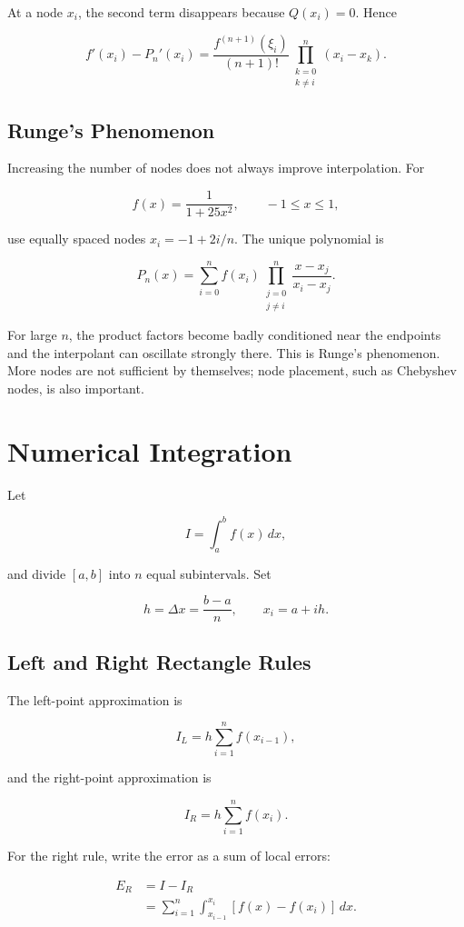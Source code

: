 \documentclass[12pt, a4paper]{article}
\theoremstyle{break}
\begin{document}
At a node \(x_i\), the second term disappears because \(Q(x_i)=0\). Hence

\[
f'(x_i)-P_n'(x_i)=
\frac{f^{(n+1)}(\xi_i)}{(n+1)!}
\prod_{\substack{k=0\\k\ne i}}^n(x_i-x_k).
\]

\subsection{Runge's Phenomenon}\label{runges-phenomenon}

Increasing the number of nodes does not always improve interpolation. For

\[
f(x)=\frac{1}{1+25x^2}, \qquad -1\le x\le 1,
\]

use equally spaced nodes \(x_i=-1+2i/n\). The unique polynomial is

\[
P_n(x)=\sum_{i=0}^n f(x_i)
\prod_{\substack{j=0\\j\ne i}}^n\frac{x-x_j}{x_i-x_j}.
\]

For large \(n\), the product factors become badly conditioned near the endpoints and the interpolant can oscillate strongly there. This is Runge's phenomenon. More nodes are not sufficient by themselves; node placement, such as Chebyshev nodes, is also important.

\section{Numerical Integration}\label{numerical-integration}

Let

\[
I=\int_a^b f(x)\,dx,
\]

and divide \([a,b]\) into \(n\) equal subintervals. Set

\[
h=\Delta x=\frac{b-a}{n},\qquad x_i=a+ih.
\]

\subsection{Left and Right Rectangle Rules}\label{left-and-right-rectangle-rules}

The left-point approximation is

\[
I_L=h\sum_{i=1}^n f(x_{i-1}),
\]

and the right-point approximation is

\[
I_R=h\sum_{i=1}^n f(x_i).
\]

For the right rule, write the error as a sum of local errors:

\[
\begin{aligned}
E_R&=I-I_R\\
&=\sum_{i=1}^n\int_{x_{i-1}}^{x_i}[f(x)-f(x_i)]\,dx.
\end{aligned}
\]
\end{document}
